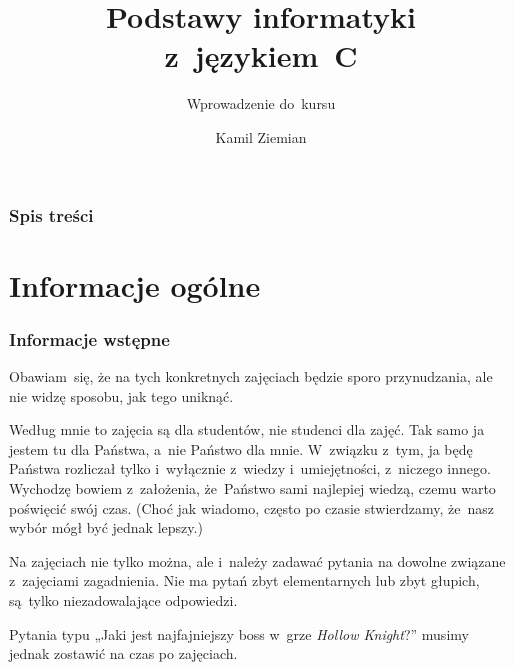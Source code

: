 \documentclass[10pt,t]{beamer}
\title{Podstawy informatyki z~językiem~C}
\subtitle{Wprowadzenie do~kursu}
\author{Kamil Ziemian}
\begin{document}





\RaggedRight





\maketitle





\begin{frame}
  \frametitle{Spis treści}


  \tableofcontents

\end{frame}





\section{Informacje ogólne}



\begin{frame}
  \frametitle{Informacje wstępne}


  Obawiam~się, że na tych konkretnych zajęciach będzie sporo przynudzania,
  ale nie widzę sposobu, jak tego uniknąć.

  Według mnie to zajęcia są dla studentów, nie studenci dla zajęć. Tak samo
  ja jestem tu dla Państwa, a~nie Państwo dla mnie. W~związku z~tym, ja
  będę Państwa rozliczał tylko i~wyłącznie z~wiedzy i~umiejętności,
  z~niczego innego. Wychodzę bowiem z~założenia, że~Państwo sami najlepiej
  wiedzą, czemu warto poświęcić swój czas. (Choć jak wiadomo, często po
  czasie stwierdzamy, że~nasz wybór mógł być jednak lepszy.)

  Na zajęciach nie tylko można, ale i~należy zadawać pytania na dowolne
  związane z~zajęciami zagadnienia. Nie ma pytań zbyt elementarnych lub
  zbyt głupich, są~tylko niezadowalające odpowiedzi.

  Pytania typu „Jaki jest najfajniejszy boss w~grze \textit{Hollow
    Knight}?” musimy jednak zostawić na czas po zajęciach.

\end{frame}
\end{document}
